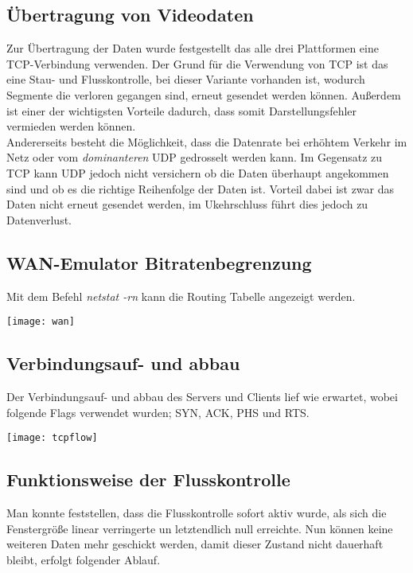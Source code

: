 \documentclass{scrartcl}
\begin{document}
  \subsection[Aufgabe 2 Übertragung von Videodaten]{Übertragung von Videodaten}
  Zur Übertragung der Daten wurde festgestellt das alle drei Plattformen eine TCP-Verbindung verwenden. 
  Der Grund für die Verwendung von TCP ist das eine Stau- und Flusskontrolle, bei dieser Variante vorhanden ist, wodurch Segmente die verloren gegangen sind, erneut gesendet werden können. Außerdem ist einer der wichtigsten Vorteile dadurch, dass somit Darstellungsfehler vermieden werden können.\\
  Andererseits besteht die Möglichkeit, dass die Datenrate bei erhöhtem Verkehr im Netz oder vom \textit{dominanteren} UDP gedrosselt werden kann.
Im Gegensatz zu TCP kann UDP jedoch nicht versichern ob die Daten überhaupt angekommen sind und ob es die richtige Reihenfolge der Daten ist. Vorteil dabei ist zwar das Daten nicht erneut gesendet werden, im Ukehrschluss führt dies jedoch zu Datenverlust.
  
  \subsection[Aufgabe 5 WAN-Emulator Bitratenbegrenzung]{WAN-Emulator Bitratenbegrenzung}

Mit dem Befehl \textit{netstat -rn} kann die Routing Tabelle angezeigt werden.

     \texttt{[image: wan]}
   \label{fig:wan}
  
    \subsection[Aufgabe 6 Verbindungsauf- und abbau]{Verbindungsauf- und abbau}

Der Verbindungsauf- und abbau des Servers und Clients lief wie erwartet, wobei folgende Flags verwendet wurden; SYN, ACK, PHS und RTS.

    \texttt{[image: tcpflow]}
   \label{fig:tcpflow}

    \subsection[Aufgabe 7 Funktionsweise der Flusskontrolle]{Funktionsweise der Flusskontrolle}
    
    Man konnte feststellen, dass die Flusskontrolle sofort aktiv wurde, als sich die Fenstergröße linear verringerte un letztendlich null erreichte. Nun können keine weiteren Daten mehr geschickt werden, damit dieser Zustand nicht dauerhaft bleibt, erfolgt folgender Ablauf. 
    
\end{document}
